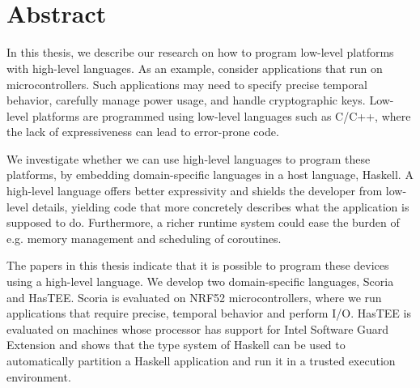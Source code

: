 \begin{raggedright}
\noindent 
{\large\textbf{\mytitle}}\\
\ifx\mysubtitle\undefined\else\textit{\small\mysubtitle}\fi
\end{raggedright}

\vskip 1mm
\noindent
{\sc\authorname}
\vskip 1mm
\noindent
\textit{\mydepartment}\\
\textit{\chalIgu}

\vskip 8mm

\section*{Abstract}

\noindent

In this thesis, we describe our research on how to program low-level platforms with high-level languages.
As an example, consider applications that run on microcontrollers. Such applications
may need to specify precise temporal behavior, carefully manage power usage, and handle cryptographic keys.
Low-level platforms are programmed using low-level languages such as C/C++, where the lack of expressiveness can
lead to error-prone code.

We investigate whether we can use high-level languages to program these platforms, by embedding domain-specific languages
in a host language, Haskell. A high-level language offers better expressivity and shields the developer from low-level
details, yielding code that more concretely describes what the application is supposed to do. Furthermore, a richer runtime
system could ease the burden of e.g. memory management and scheduling of coroutines.

The papers in this thesis indicate that it is possible to program these devices using a high-level language. We develop
two domain-specific languages, Scoria and HasTEE. Scoria is evaluated on NRF52 microcontrollers, where we run applications
that require precise, temporal behavior and perform I/O. HasTEE is evaluated on machines whose processor has support
for Intel Software Guard Extension and shows that the type system of Haskell can be used to automatically partition a Haskell
application and run it in a trusted execution environment.


\vspace{10 mm}

\vspace{3 mm}

